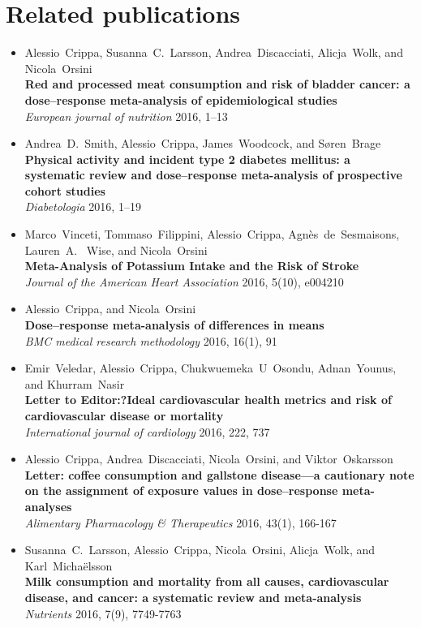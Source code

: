 \chapter*{Related publications}
\begin{itemize}
\item Alessio~Crippa, Susanna~C.~Larsson, Andrea~Discacciati, Alicja~Wolk, and Nicola~Orsini \\ \textbf{Red and processed meat consumption and risk of bladder cancer: a dose--response meta-analysis of epidemiological studies} \\ \textit{European journal of nutrition} 2016, 1--13
\item Andrea~D.~Smith, Alessio~Crippa, James~Woodcock, and S{\o}ren~Brage \\ \textbf{Physical activity and incident type 2 diabetes mellitus: a systematic review and dose--response meta-analysis of prospective cohort studies} \\ \textit{Diabetologia} 2016, 1--19
\item Marco~Vinceti, Tommaso~Filippini, Alessio~Crippa, Agn{\`e}s~de~Sesmaisons, Lauren~A.~ Wise, and Nicola~Orsini \\ \textbf{Meta-Analysis of Potassium Intake and the Risk of Stroke} \\ \textit{Journal of the American Heart Association} 2016, 5(10), e004210
\item Alessio~Crippa, and Nicola~Orsini \\ \textbf{Dose--response meta-analysis of differences in means} \\ \textit{BMC medical research methodology} 2016, 16(1), 91
\item Emir~Veledar, Alessio~Crippa, Chukwuemeka~U~Osondu, Adnan~Younus, and Khurram~Nasir \\ \textbf{Letter to Editor:?Ideal cardiovascular health metrics and risk of cardiovascular disease or mortality} \\ \textit{International journal of cardiology} 2016, 222, 737
\item Alessio~Crippa, Andrea~Discacciati, Nicola~Orsini, and Viktor~Oskarsson \\ \textbf{Letter: coffee consumption and gallstone disease---a cautionary note on the assignment of exposure values in dose--response meta-analyses} \\ \textit{Alimentary Pharmacology \& Therapeutics} 2016, 43(1), 166-167
\item Susanna~C.~Larsson, Alessio~Crippa, Nicola~Orsini, Alicja~Wolk, and Karl~Micha{\"e}lsson \\ \textbf{Milk consumption and mortality from all causes, cardiovascular disease, and cancer: a systematic review and meta-analysis} \\ \textit{Nutrients} 2016, 7(9), 7749-7763

\end{itemize}

